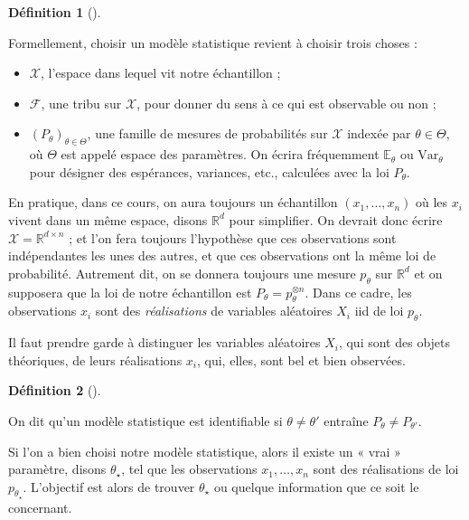 \documentclass[
  10,
  letterpaper,
  DIV=11,
  numbers=noendperiod]{scrreport}
\providecommand{\tightlist}{%
  \setlength{\itemsep}{0pt}\setlength{\parskip}{0pt}}\usepackage{longtable,booktabs,array}
\theoremstyle{plain}
\theoremstyle{definition}
\theoremstyle{plain}
\theoremstyle{definition}
\newtheorem{definition}{Définition}[chapter]
\theoremstyle{definition}
\theoremstyle{plain}
\theoremstyle{remark}
\begin{document}
\begin{definition}[]\protect\hypertarget{def-mst}{}\label{def-mst}

Formellement, choisir un modèle statistique revient à choisir trois
choses :~

\begin{itemize}
\tightlist
\item
  \(\mathcal{X}\), l'espace dans lequel vit notre échantillon ;~
\item
  \(\mathscr{F}\), une tribu sur \(\mathcal{X}\), pour donner du sens à
  ce qui est observable ou non ;
\item
  \((P_\theta)_{\theta \in \Theta}\), une famille de mesures de
  probabilités sur \(\mathcal{X}\) indexée par \(\theta \in \Theta\), où
  \(\Theta\) est appelé espace des paramètres. On écrira fréquemment
  \(\mathbb{E}_\theta\) ou \(\mathrm{Var}_\theta\) pour désigner des
  espérances, variances, etc., calculées avec la loi \(P_\theta\).
\end{itemize}

\end{definition}

En pratique, dans ce cours, on aura toujours un échantillon
\((x_1, \dotsc, x_n)\) où les \(x_i\) vivent dans un même espace, disons
\(\mathbb{R}^d\) pour simplifier. On devrait donc écrire
\(\mathcal{X} = \mathbb{R}^{d\times n}\) ; et l'on fera toujours
l'hypothèse que ces observations sont indépendantes les unes des autres,
et que ces observations ont la même loi de probabilité. Autrement dit,
on se donnera toujours une mesure \(p_\theta\) sur \(\mathbb{R}^d\) et
on supposera que la loi de notre échantillon est
\(P_\theta = p_\theta^{\otimes n}\). Dans ce cadre, les observations
\(x_i\) sont des \emph{réalisations} de variables aléatoires \(X_i\) iid
de loi \(p_\theta\).

Il faut prendre garde à distinguer les variables aléatoires \(X_i\), qui
sont des objets théoriques, de leurs réalisations \(x_i\), qui, elles,
sont bel et bien observées.

\begin{definition}[]\protect\hypertarget{def-identifiable}{}\label{def-identifiable}

On dit qu'un modèle statistique est identifiable si
\(\theta \neq \theta'\) entraîne \(P_\theta \neq P_{\theta'}\).

\end{definition}

Si l'on a bien choisi notre modèle statistique, alors il existe un «
vrai » paramètre, disons \(\theta_\star\), tel que les observations
\(x_1, \dotsc, x_n\) sont des réalisations de loi \(p_{\theta_\star}\).
L'objectif est alors de trouver \(\theta_\star\) ou quelque information
que ce soit le concernant.
\end{document}

